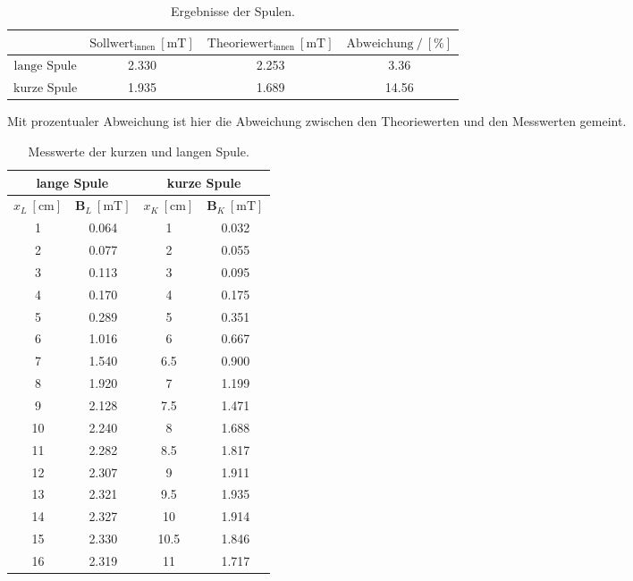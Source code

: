 \begin{table}
  \centering
  \caption{Ergebnisse der Spulen.}
  \label{tab:ergebnisSpulen}
  \begin{tabular}{S S S S}
    \toprule
    & {$\text{Sollwert}_\text{innen} \: [\si{\milli\tesla}]$}
    & {$\text{Theoriewert}_\text{innen} \: [\si{\milli\tesla}]$}
    & {$\text{Abweichung} \:/\: [\si{\percent}]$}\\
    \midrule
    $\text{lange Spule}$ & 2.330 & 2.253 & 3.36\\
    $\text{kurze Spule}$ & 1.935 & 1.689 & 14.56\\
    \bottomrule
  \end{tabular}
\end{table}
Mit prozentualer Abweichung ist hier die Abweichung zwischen den Theoriewerten
und den Messwerten gemeint.
\begin{table}
  \centering
  \caption{Messwerte der kurzen und langen Spule.}
  \label{tab:MesswerteKL}
  \begin{tabular}{S[table-format=2.0] S| |S[table-format=2.1] S}
    \toprule
    &  \\
    \hline
    {$x_L \: [\si{\centi\meter}]$}
    & {$\symbf{B}_L \: [\si{\milli\tesla}]$}
    & {$x_K \: [\si{\centi\meter}]$}
    & {$\symbf{B}_K \: [\si{\milli\tesla}]$}
    \\
      & 0.064 & 1    & 0.032 \\
    2  & 0.077 & 2    & 0.055 \\
    3  & 0.113 & 3    & 0.095 \\
    4  & 0.170 & 4    & 0.175 \\
    5  & 0.289 & 5    & 0.351 \\
    6  & 1.016 & 6    & 0.667 \\
    7  & 1.540 & 6.5  & 0.900 \\
    8  & 1.920 & 7    & 1.199 \\
    9  & 2.128 & 7.5  & 1.471 \\
    10 & 2.240 & 8    & 1.688 \\
    11 & 2.282 & 8.5  & 1.817 \\
    12 & 2.307 & 9    & 1.911 \\
    13 & 2.321 & 9.5  & 1.935 \\
    14 & 2.327 & 10   & 1.914 \\
    15 & 2.330 & 10.5 & 1.846 \\
    16 & 2.319 & 11   & 1.717 \\

\end{tabular}
\end{table}
